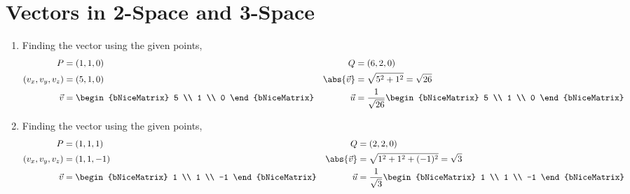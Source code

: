 \section{Vectors in 2-Space and 3-Space}

\begin{enumerate}
    \item Finding the vector using the given points,
          \begin{align}
              P                     & = (1, 1, 0)                              &
              Q                     & = (6, 2, 0)                                \\
              (v_x, v_y, v_z)       & = (5, 1, 0)                              &
              \abs{ \vec{v} } & = \sqrt{5^2 + 1^2} = \sqrt{26}             \\
              \vec{v}               & = \begin{bNiceMatrix}
                                            5 \\ 1 \\ 0
                                        \end{bNiceMatrix}                    &
              \vec{u}               & = \frac{1}{\sqrt{26}}\begin{bNiceMatrix}
                                                               5 \\ 1 \\ 0
                                                           \end{bNiceMatrix}
          \end{align}

    \item Finding the vector using the given points,
          \begin{align}
              P                     & = (1, 1, 1)                             &
              Q                     & = (2, 2, 0)                               \\
              (v_x, v_y, v_z)       & = (1, 1, -1)                            &
              \abs{ \vec{v} } & = \sqrt{1^2 + 1^2 + (-1)^2} = \sqrt{3}    \\
              \vec{v}               & = \begin{bNiceMatrix}
                                            1 \\ 1 \\ -1
                                        \end{bNiceMatrix}                   &
              \vec{u}               & = \frac{1}{\sqrt{3}}\begin{bNiceMatrix}
                                                              1 \\ 1 \\ -1
                                                          \end{bNiceMatrix}
          \end{align}


\end{enumerate}
